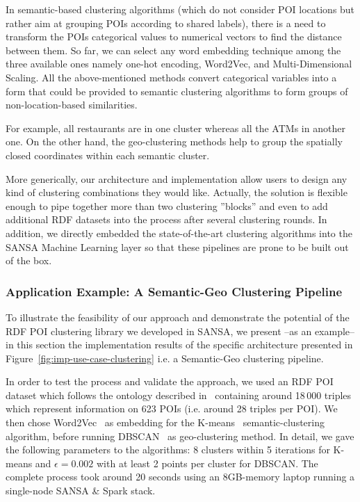 In semantic-based clustering algorithms (which do not consider \gls{POI} locations but rather aim at grouping \gls{POI}s according to shared labels), there is a need to transform the \gls{POI}s categorical values to numerical vectors to find the distance between them. 
So far, we can select any word embedding technique among the three available ones namely one-hot encoding, Word2Vec, and Multi-Dimensional Scaling.
All the above-mentioned methods convert categorical variables into a form that could be provided to semantic clustering algorithms to form groups of non-location-based similarities.

For example, all restaurants are in one cluster whereas all the ATMs in another one.
On the other hand, the geo-clustering methods help to group the spatially closed coordinates within each semantic cluster.

More generically, our architecture and implementation allow users to design any kind of clustering combinations they would like. Actually, the solution is flexible enough to pipe together more than two clustering ''blocks'' and even to add additional \gls{RDF} datasets into the process after several clustering rounds. 
In addition, we directly embedded the state-of-the-art clustering algorithms into the SANSA Machine Learning layer so that these pipelines are prone to be built out of the box.


\subsubsection{Application Example: A Semantic-Geo Clustering Pipeline}
To illustrate the feasibility of our approach and demonstrate the potential of the \gls{RDF} \gls{POI} clustering library we developed in SANSA, we present --as an example-- in this section the implementation results of the specific architecture presented in Figure~\ref{fig:imp-use-case-clustering} i.e. a Semantic-Geo clustering pipeline.

In order to test the process and validate the approach, we used an \gls{RDF} \gls{POI} dataset which follows the ontology described in~\cite{Athanasiou2019BigPD} containing around 18\,000 triples which represent information on 623 \gls{POI}s (i.e. around 28 triples per \gls{POI}). 
We then chose Word2Vec~\cite{mikolov2013distributed} as embedding for the K-means~\cite{kmeans-algo} semantic-clustering algorithm, before running DBSCAN~\cite{ester1996density} as geo-clustering method. 
In detail, we gave the following parameters to the algorithms: 8 clusters within 5 iterations for K-means and $\epsilon=0.002$ with at least 2 points per cluster for DBSCAN.
The complete process took around 20 seconds using an 8GB-memory laptop running a single-node SANSA \& Spark stack.

